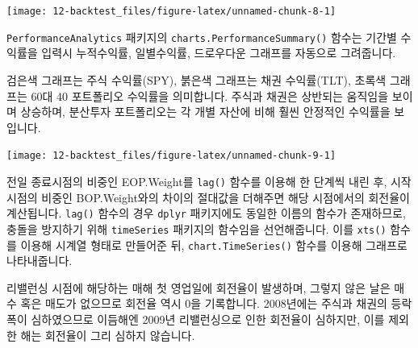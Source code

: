 \documentclass[12pt,]{book}
\newenvironment{Shaded}{\begin{snugshade}}{\end{snugshade}}
\newcommand{\DataTypeTok}[1]{\textcolor[rgb]{0.13,0.29,0.53}{#1}}
\newcommand{\KeywordTok}[1]{\textcolor[rgb]{0.13,0.29,0.53}{\textbf{#1}}}
\newcommand{\NormalTok}[1]{#1}
\newcommand{\OperatorTok}[1]{\textcolor[rgb]{0.81,0.36,0.00}{\textbf{#1}}}
\newcommand{\OtherTok}[1]{\textcolor[rgb]{0.56,0.35,0.01}{#1}}
\newcommand{\StringTok}[1]{\textcolor[rgb]{0.31,0.60,0.02}{#1}}
\begin{document}
\begin{center}\texttt{[image: 12-backtest\_files/figure-latex/unnamed-chunk-8-1]} \end{center}

\texttt{PerformanceAnalytics} 패키지의 \texttt{charts.PerformanceSummary()} 함수는 기간별 수익률을 입력시 누적수익률, 일별수익률, 드로우다운 그래프를 자동으로 그려줍니다.

검은색 그래프는 주식 수익률(SPY), 붉은색 그래프는 채권 수익률(TLT), 초록색 그래프는 60대 40 포트폴리오 수익률을 의미합니다. 주식과 채권은 상반되는 움직임을 보이며 상승하며, 분산투자 포트폴리오는 각 개별 자산에 비해 훨씬 안정적인 수익률을 보입니다.

\begin{Shaded}
\end{Shaded}

\begin{center}\texttt{[image: 12-backtest\_files/figure-latex/unnamed-chunk-9-1]} \end{center}

전일 종료시점의 비중인 EOP.Weight를 \texttt{lag()} 함수를 이용해 한 단계씩 내린 후, 시작시점의 비중인 BOP.Weight와의 차이의 절대값을 더해주면 해당 시점에서의 회전율이 계산됩니다. \texttt{lag()} 함수의 경우 \texttt{dplyr} 패키지에도 동일한 이름의 함수가 존재하므로, 충돌을 방지하기 위해 \texttt{timeSeries} 패키지의 함수임을 선언해줍니다. 이를 \texttt{xts()} 함수를 이용해 시계열 형태로 만들어준 뒤, \texttt{chart.TimeSeries()} 함수를 이용해 그래프로 나타내줍니다.

리밸런싱 시점에 해당하는 매해 첫 영업일에 회전율이 발생하며, 그렇지 않은 날은 매수 혹은 매도가 없으므로 회전율 역시 0을 기록합니다. 2008년에는 주식과 채권의 등락폭이 심하였으므로 이듬해엔 2009년 리밸런싱으로 인한 회전율이 심하지만, 이를 제외한 해는 회전율이 그리 심하지 않습니다.
\end{document}

